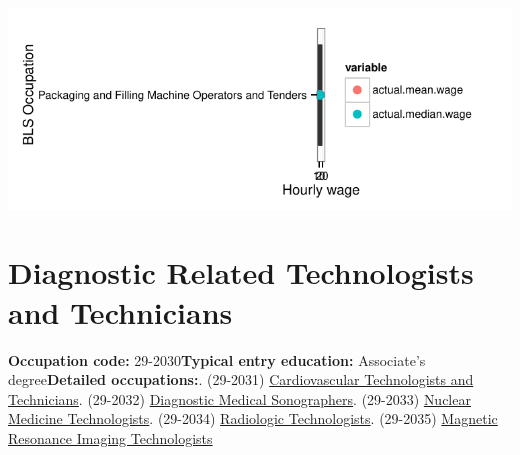 \documentclass[a4paper,10pt]{article}\usepackage[]{graphicx}\usepackage[]{color}
\makeatletter
\def\maxwidth{ %
  \ifdim\Gin@nat@width>\linewidth
    \linewidth
  \else
    \Gin@nat@width
  \fi
}
\makeatother
\begin{document}
{\centering \includegraphics[width=\maxwidth]{figure/unnamed-chunk-292} 

}


\newpage\section{Diagnostic Related Technologists and Technicians}\textbf{Occupation code:} 29-2030\newline\textbf{Typical entry education:} Associate's degree\newline\textbf{Detailed occupations:}. (29-2031)  \href{http://www.bls.gov/oes/current/oes292031.htm}{Cardiovascular Technologists and Technicians}. (29-2032)  \href{http://www.bls.gov/oes/current/oes292032.htm}{Diagnostic Medical Sonographers}. (29-2033)  \href{http://www.bls.gov/oes/current/oes292033.htm}{Nuclear Medicine Technologists}. (29-2034)  \href{http://www.bls.gov/oes/current/oes292034.htm}{Radiologic Technologists}. (29-2035)  \href{http://www.bls.gov/oes/current/oes292035.htm}{Magnetic Resonance Imaging Technologists}\newline%
\end{document}
